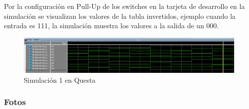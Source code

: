 Por la configuración en Pull-Up de los switches en la tarjeta de desarrollo en la simulación se visualizan los valores de la tabla invertidos, ejemplo cuando la entrada es 111, la simulación muestra los valores a la salida de un 000.

\begin{figure}
    \centering
    \includegraphics[width=1\linewidth]{imagenes/Sim_1.png}
    \caption{Simulación 1 en Questa}
    \label{fig:Sim_1}
\end{figure}

\subsubsection*{Fotos}

